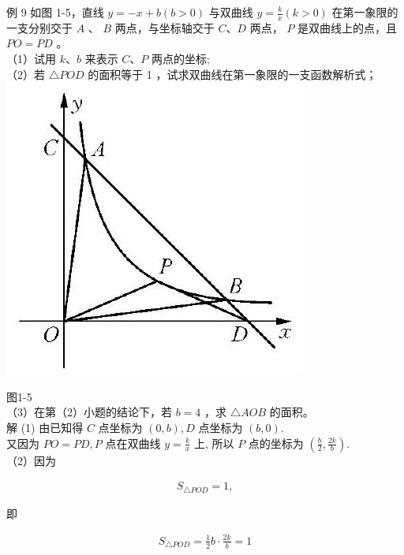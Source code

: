\documentclass[10pt]{article}
\begin{document}
例 9 如图 1-5，直线 $y=-x+b(b>0)$ 与双曲线 $y=\frac{k}{x}(k>0)$ 在第一象限的一支分别交于 $A$ 、 $B$ 两点，与坐标轴交于 $C 、 D$ 两点， $P$ 是双曲线上的点，且 $P O=P D$ 。\\
（1）试用 $k 、 b$ 来表示 $C 、 P$ 两点的坐标;\\
（2）若 $\triangle P O D$ 的面积等于 1 ，试求双曲线在第一象限的一支函数解析式；\\
\includegraphics[max width=\textwidth, center]{2024_10_30_1bf34f7aeb61f11d11d3g-016}

图1-5\\
（3）在第（2）小题的结论下，若 $b=4$ ，求 $\triangle A O B$ 的面积。\\
解 (1) 由已知得 $C$ 点坐标为 $(0, b), D$ 点坐标为 $(b, 0)$.\\
又因为 $P O=P D, P$ 点在双曲线 $y=\frac{k}{x}$ 上, 所以 $P$ 点的坐标为 $\left(\frac{b}{2}, \frac{2 k}{b}\right)$.\\
（2）因为

\begin{align*}
S_{\triangle P O D}=1,
\end{align*}

即

\begin{align*}
S_{\triangle P O D}=\frac{1}{2} b \cdot \frac{2 k}{b}=1
\end{align*}
\end{document}
